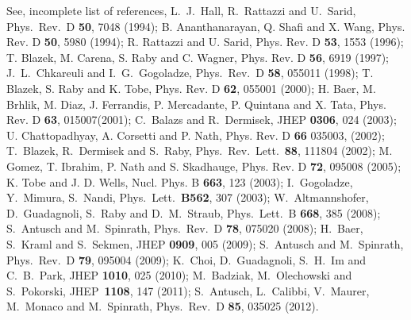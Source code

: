\documentclass[12pt]{article}
\begin{document}
\begin{thebibliography}{99}
See, incomplete list of references,
L.~J.~Hall, R.~Rattazzi and U.~Sarid, Phys.\ Rev.\  D {\bf 50}, 7048 (1994);
 B. Ananthanarayan, Q. Shafi and X.
Wang, Phys. Rev. D {\bf 50}, 5980 (1994);
R. Rattazzi and U. Sarid, Phys. Rev. D {\bf 53}, 1553
(1996); T. Blazek, M. Carena, S. Raby and C. Wagner, Phys. Rev. D
{\bf 56}, 6919 (1997);
J.~L.~Chkareuli and I.~G.~Gogoladze,
  Phys.\ Rev.\  D {\bf 58}, 055011 (1998);
T. Blazek, S. Raby and K. Tobe, Phys. Rev. D
{\bf 62}, 055001 (2000); H. Baer, M. Brhlik, M. Diaz,
J. Ferrandis, P. Mercadante, P. Quintana and X. Tata, Phys. Rev. D
{\bf 63}, 015007(2001);  C.~Balazs and R.~Dermisek, JHEP {\bf 0306}, 024 (2003);
 U. Chattopadhyay, A. Corsetti and P.
Nath, Phys. Rev. D {\bf 66} 035003, (2002); T.~Blazek, R.~Dermisek
and S.~Raby, Phys.\ Rev.\ Lett.\  {\bf 88}, 111804 (2002); M. Gomez, T. Ibrahim, P. Nath and
S. Skadhauge, Phys. Rev. D {\bf 72}, 095008 (2005); K. Tobe and J.
D. Wells, Nucl. Phys. B {\bf 663}, 123 (2003);
I.~Gogoladze, Y.~Mimura, S.~Nandi,
  Phys.\ Lett.\  {\bf B562}, 307 (2003);
W.~Altmannshofer,
D.~Guadagnoli, S.~Raby and D.~M.~Straub, Phys.\ Lett.\  B {\bf 668},
385 (2008);
S.~Antusch and M.~Spinrath,
 Phys.\ Rev.\  D {\bf 78}, 075020 (2008);
 H.~Baer, S.~Kraml and S.~Sekmen, JHEP {\bf 0909}, 005 (2009);
S.~Antusch and M.~Spinrath,
Phys.\ Rev.\  D {\bf 79}, 095004 (2009);
K.~Choi, D.~Guadagnoli, S.~H.~Im and C.~B.~Park,
  JHEP {\bf 1010}, 025 (2010);
  M.~Badziak, M.~Olechowski and S.~Pokorski,
  JHEP\ {\bf 1108}, 147  (2011);
  S.~Antusch, L.~Calibbi, V.~Maurer, M.~Monaco and M.~Spinrath,
   Phys.\ Rev.\ D {\bf 85}, 035025 (2012).

\end{thebibliography}
\end{document}
